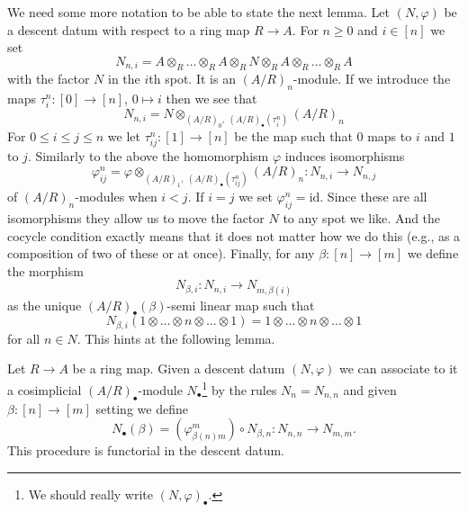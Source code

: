 \medskip\noindent
We need some more notation to be able to state the next lemma.
Let $(N, \varphi)$ be a descent datum with respect to a ring map $R \to A$.
For $n \geq 0$ and $i \in [n]$ we set
$$
N_{n, i} =
A \otimes_R
\ldots
\otimes_R A \otimes_R N \otimes_R A \otimes_R
\ldots
\otimes_R A
$$
with the factor $N$ in the $i$th spot. It is an $(A/R)_n$-module.
If we introduce the maps $\tau^n_i : [0] \to [n]$, $0 \mapsto i$
then we see that
$$
N_{n, i} = N \otimes_{(A/R)_0, \ (A/R)_\bullet(\tau^n_i)} (A/R)_n
$$
For $0 \leq i \leq j \leq n$ we let $\tau^n_{ij} : [1] \to [n]$
be the map such that $0$ maps to $i$ and $1$ to $j$. Similarly
to the above the homomorphism $\varphi$ induces isomorphisms
$$
\varphi^n_{ij}
=
\varphi \otimes_{(A/R)_1, \ (A/R)_\bullet(\tau^n_{ij})} (A/R)_n :
N_{n, i} \longrightarrow N_{n, j}
$$
of $(A/R)_n$-modules when $i < j$. If $i = j$ we set
$\varphi^n_{ij} = \text{id}$. Since these are all isomorphisms they allow us
to move the factor $N$ to any spot we like. And the cocycle condition
exactly means that it does not matter how we do this (e.g., as a composition
of two of these or at once). Finally, for any $\beta : [n] \to [m]$
we define the morphism
$$
N_{\beta, i} : N_{n, i} \to N_{m, \beta(i)}
$$
as the unique $(A/R)_\bullet(\beta)$-semi linear map such that
$$
N_{\beta, i}(1 \otimes \ldots \otimes n \otimes \ldots \otimes 1)
=
1 \otimes \ldots \otimes n \otimes \ldots \otimes 1
$$
for all $n \in N$.
This hints at the following lemma.

\begin{lemma}
\label{lemma-descent-datum-cosimplicial}
Let $R \to A$ be a ring map.
Given a descent datum $(N, \varphi)$ we can associate to it a
cosimplicial $(A/R)_\bullet$-module $N_\bullet$\footnote{We should really
write $(N, \varphi)_\bullet$.} by the
rules $N_n = N_{n, n}$ and given $\beta : [n] \to [m]$
setting we define
$$
N_\bullet(\beta) = (\varphi^m_{\beta(n)m}) \circ N_{\beta, n} :
N_{n, n} \longrightarrow N_{m, m}.
$$
This procedure is functorial in the descent datum.
\end{lemma}

